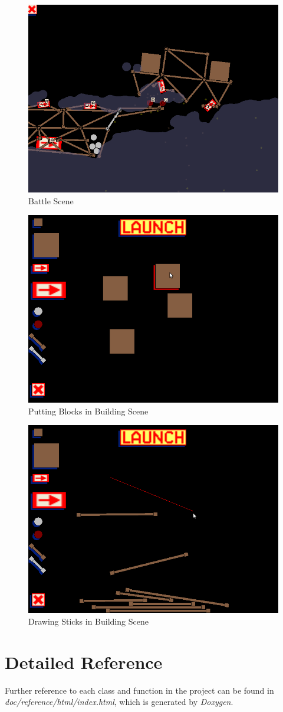 \documentclass[UTF8]{ctexart}
\begin{document}
            \begin{figure}[H]
                \centering
                \includegraphics[width=.8\textwidth]{battle_scene.png}
                \caption{Battle Scene}
            \end{figure}

            \begin{figure}[H]
                \centering
                \includegraphics[width=.8\textwidth]{putting_blocks.png}
                \caption{Putting Blocks in Building Scene}
            \end{figure}

            \begin{figure}[H]
                \centering
                \includegraphics[width=.8\textwidth]{drawing_sticks.png}
                \caption{Drawing Sticks in Building Scene}
            \end{figure}

    \section{Detailed Reference}

        Further reference to each class and function in the project can be found in \textit{doc/reference/html/index.html}, which is generated by \textit{Doxygen}.
\end{document}
